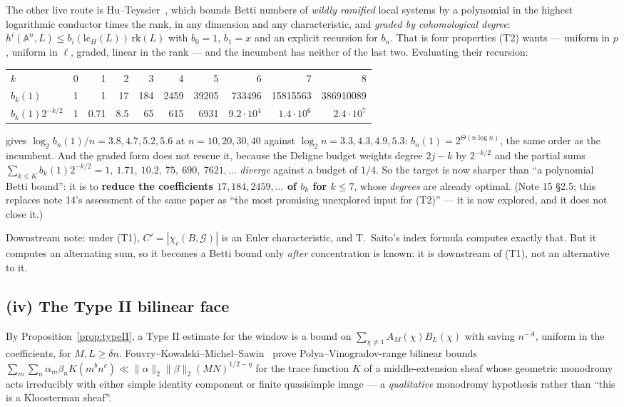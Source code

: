 \documentclass[10pt]{article}
\theoremstyle{plain}
\theoremstyle{definition}
\begin{document}
The other live route is Hu--Teyssier~\cite{HT}, which bounds Betti numbers of
\emph{wildly ramified} local systems by a polynomial in the highest logarithmic
conductor times the rank, in any dimension and any characteristic, and
\emph{graded by cohomological degree}: $h^i(\mathbb A^n,L)\le b_i(\mathrm{lc}_H(L))\,\mathrm{rk}(L)$
with $b_0=1$, $b_1=x$ and an explicit recursion for $b_n$. That is four
properties (T2) wants --- uniform in $p$, uniform in $\ell$, graded, linear in the
rank --- and the incumbent has neither of the last two. Evaluating their
recursion:
\begin{center}\small
\begin{tabular}{lrrrrrrrrr}
\hline
$k$ & 0 & 1 & 2 & 3 & 4 & 5 & 6 & 7 & 8\\
$b_k(1)$ & 1 & 1 & 17 & 184 & 2459 & 39205 & 733496 & 15815563 & 386910089\\
$b_k(1)2^{-k/2}$ & 1 & 0.71 & 8.5 & 65 & 615 & 6931 & $9.2\!\cdot\!10^4$ & $1.4\!\cdot\!10^6$ & $2.4\!\cdot\!10^7$\\
\hline
\end{tabular}
\end{center}
gives $\log_2b_n(1)/n=3.8,4.7,5.2,5.6$ at $n=10,20,30,40$ against
$\log_2n=3.3,4.3,4.9,5.3$: $b_n(1)=2^{\Theta(n\log n)}$, the same order as the
incumbent. And the graded form does not rescue it, because the Deligne budget
weights degree $2j-k$ by $2^{-k/2}$ and the partial sums
$\sum_{k\le K}b_k(1)2^{-k/2}=1,\ 1.71,\ 10.2,\ 75,\ 690,\ 7621,\dots$
\emph{diverge} against a budget of $1/4$. So the target is now sharper than
``a polynomial Betti bound'': it is to \textbf{reduce the coefficients
$17,184,2459,\dots$ of $b_k$ for $k\le7$}, whose \emph{degrees} are already
optimal. (Note 15 \S2.5; this replaces note 14's assessment of the same paper
as ``the most promising unexplored input for (T2)'' --- it is now explored, and
it does not close it.)

Downstream note: under (T1), $C'=|\chi_c(B,\mathcal G)|$ is an Euler
characteristic, and T.~Saito's index formula computes exactly that. But it
computes an alternating sum, so it becomes a Betti bound only \emph{after}
concentration is known: it is downstream of (T1), not an alternative to it.

\subsection*{(iv) The Type II bilinear face}

By Proposition~\ref{prop:typeII}, a Type II estimate for the window is a bound
on $\sum_{\chi\ne1}A_M(\chi)B_L(\chi)$ with saving $n^{-A}$, uniform in the
coefficients, for $M,L\ge\delta n$. Fouvry--Kowalski--Michel--Sawin~\cite{FKMS}
prove Polya--Vinogradov-range bilinear bounds
$\sum_m\sum_n\alpha_m\beta_nK(m^bn^c)\ll\|\alpha\|_2\|\beta\|_2(MN)^{1/2-\eta}$
for the trace function $K$ of a middle-extension sheaf whose geometric
monodromy acts irreducibly with either simple identity component or finite
quasisimple image --- a \emph{qualitative} monodromy hypothesis rather than
``this is a Kloosterman sheaf''.
\end{document}
